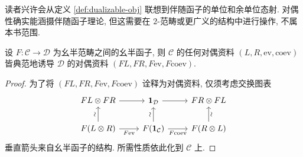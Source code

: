 读者兴许会从定义 \ref{def:dualizable-obj} 联想到伴随函子的单位和余单位态射. 对偶性确实能涵摄伴随函子理论, 但这需要在 $2$-范畴或更广义的结构中进行操作, 不属本书范围.

\begin{proposition}\label{prop:monoidal-functor-dual}
	设 $F: \mathcal{C} \to \mathcal{D}$ 为幺半范畴之间的幺半函子, 则 $\mathcal{C}$ 的任何对偶资料 $(L, R, \mathrm{ev}, \mathrm{coev})$ 皆典范地诱导 $\mathcal{D}$ 的对偶资料 $(FL, FR, F\mathrm{ev}, F\mathrm{coev})$.
\end{proposition}
\begin{proof}
	为了将 $(FL, FR, F\mathrm{ev}, F\mathrm{coev})$ 诠释为对偶资料, 仅须考虑交换图表
	\[\begin{tikzcd}
		FL \otimes FR \arrow[r] & \munit_{\mathcal{D}} \arrow[r] & FR \otimes FL \\
		F(L \otimes R) \arrow[r, "{F\mathrm{ev}}"'] \arrow[u, "\sim" sloped] & F(\munit_{\mathcal{C}}) \arrow[u, "\sim" sloped] \arrow[r, "{F\mathrm{coev}}"'] & F(R \otimes L) \arrow[u, "\sim"' sloped]
	\end{tikzcd}\]
	垂直箭头来自幺半函子的结构. 所需性质依此化到 $\mathcal{C}$ 上.
\end{proof}

